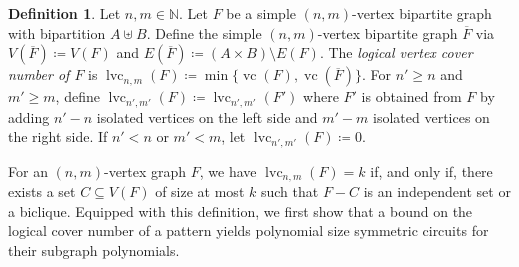 \documentclass[10pt,a4paper]{article}
\theoremstyle{definition}
\newtheorem{definition}{Definition}[section]
\theoremstyle{plain}
\theoremstyle{remark}
\DeclareMathOperator{\vc}{vc}
\DeclareMathOperator{\cc}{lvc}
\begin{document}
\begin{definition}
	\label{def:bcc}
	Let $n,m \in \mathbb{N}$.
	Let $F$ be a simple $(n,m)$-vertex bipartite graph with bipartition $A \uplus B$.
	Define the simple $(n,m)$-vertex bipartite graph $\overline{F}$ via $V(\overline{F}) \coloneqq V(F)$ and $E(\overline{F}) \coloneqq (A \times B) \setminus E(F)$.
	The \emph{logical vertex cover number of $F$} is
	$
	\cc_{n,m}(F) \coloneqq \min\{\vc(F), \vc(\overline{F})\}.
	$
	For $n' \geq n$ and $m' \geq m$, define $\cc_{n',m'}(F) \coloneqq \cc_{n',m'}(F')$ where $F'$ is obtained from $F$ by adding $n'-n$ isolated vertices on the left side and $m'-m$ isolated vertices on the right side.
	If $n' < n$ or $m' < m$, let $\cc_{n',m'}(F) \coloneqq 0$.
\end{definition}



	
	For an $(n,m)$-vertex graph $F$, we have $\cc_{n,m}(F) = k$ if, and only if, there exists a set $C \subseteq V(F)$ of size at most $k$ such that $F - C$ is an independent set or a biclique.
	Equipped with this definition,
	we first show that a bound on the logical cover number of a pattern yields polynomial size symmetric circuits for their subgraph polynomials.
	
\end{document}
